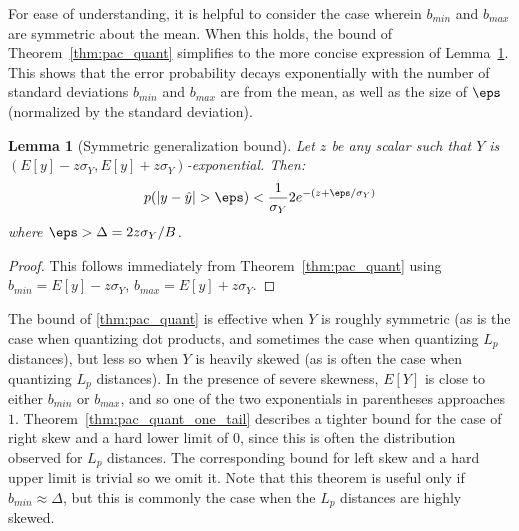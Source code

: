 \documentclass[]{article}
\newtheorem{lemma}{Lemma}[section]
\begin{document}

For ease of understanding, it is helpful to consider the case wherein $b_{min}$ and $b_{max}$ are symmetric about the mean. When this holds, the bound of Theorem~\ref{thm:pac_quant} simplifies to the more concise expression of Lemma~\ref{thm:pac_quant_z}. This shows that the error probability decays exponentially with the number of standard deviations $b_{min}$ and $b_{max}$ are from the mean, as well as the size of $\eps$ (normalized by the standard deviation).

\begin{lemma}[Symmetric generalization bound] \label{thm:pac_quant_z}
Let $z$ be any scalar such that $Y$ is $(E[y] - z \sigma_Y, E[y] + z \sigma_Y)$-exponential. Then:
\begin{align}
    p(|y - \hat{y}| > \eps) < \frac{1}{\sigma_Y} 2e^{-(z + \eps / \sigma_Y)}
\end{align}
where $\eps > \Delta = 2z\sigma_Y / B$.
\end{lemma}

\begin{proof}
This follows immediately from Theorem~\ref{thm:pac_quant} using $b_{min} = E[y] - z \sigma_Y$, $b_{max} = E[y] + z \sigma_Y$. %
\end{proof}

The bound of \ref{thm:pac_quant} is effective when $Y$ is roughly symmetric (as is the case when quantizing dot products, and sometimes the case when quantizing $L_p$ distances), but less so when $Y$ is heavily skewed (as is often the case when quantizing $L_p$ distances). In the presence of severe skewness, $E[Y]$ is close to either $b_{min}$ or $b_{max}$, and so one of the two exponentials in parentheses approaches $1$. Theorem~\ref{thm:pac_quant_one_tail} describes a tighter bound for the case of right skew and a hard lower limit of $0$, since this is often the distribution observed for $L_p$ distances. The corresponding bound for left skew and a hard upper limit is trivial so we omit it. Note that this theorem is useful only if $b_{min} \approx \Delta$, but this is commonly the case when the $L_p$ distances are highly skewed.
\end{document}
